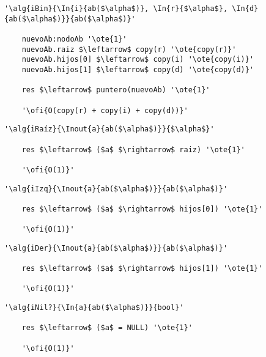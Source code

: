 	\begin{lstlisting}[mathescape]
	'\alg{iBin}{\In{i}{ab($\alpha$)}, \In{r}{$\alpha$},	\In{d}{ab($\alpha$)}}{ab($\alpha$)}'

	nuevoAb:nodoAb '\ote{1}'
	nuevoAb.raiz $\leftarrow$ copy(r) '\ote{copy(r)}'
	nuevoAb.hijos[0] $\leftarrow$ copy(i) '\ote{copy(i)}'
	nuevoAb.hijos[1] $\leftarrow$ copy(d) '\ote{copy(d)}'

	res $\leftarrow$ puntero(nuevoAb) '\ote{1}'

	'\ofi{O(copy(r) + copy(i) + copy(d))}'
	\end{lstlisting}

	\begin{lstlisting}[mathescape]
	'\alg{iRaíz}{\Inout{a}{ab($\alpha$)}}{$\alpha$}'

	res $\leftarrow$ ($a$ $\rightarrow$ raiz) '\ote{1}'

	'\ofi{O(1)}'
	\end{lstlisting}
\pagebreak
	\begin{lstlisting}[mathescape]
	'\alg{iIzq}{\Inout{a}{ab($\alpha$)}}{ab($\alpha$)}'

	res $\leftarrow$ ($a$ $\rightarrow$ hijos[0]) '\ote{1}'

	'\ofi{O(1)}'
	\end{lstlisting}

	\begin{lstlisting}[mathescape]
	'\alg{iDer}{\Inout{a}{ab($\alpha$)}}{ab($\alpha$)}'

	res $\leftarrow$ ($a$ $\rightarrow$ hijos[1]) '\ote{1}'

	'\ofi{O(1)}'
	\end{lstlisting}

	\begin{lstlisting}[mathescape]
	'\alg{iNil?}{\In{a}{ab($\alpha$)}}{bool}'

	res $\leftarrow$ ($a$ = NULL) '\ote{1}'

	'\ofi{O(1)}'
	\end{lstlisting}
